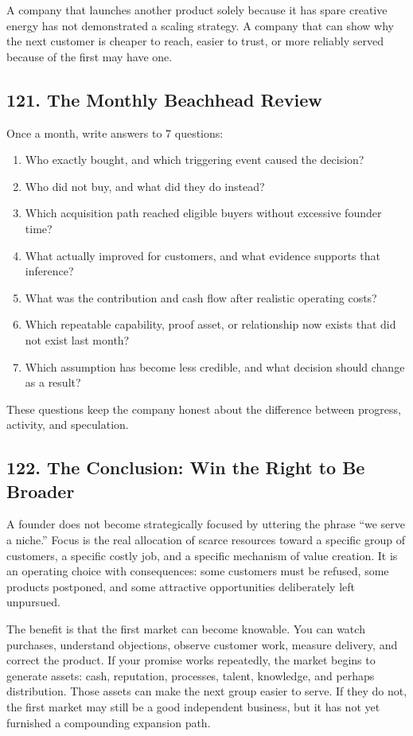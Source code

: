 A company that launches another product solely because it has spare creative energy has not demonstrated a scaling strategy. A company that can show why the next customer is cheaper to reach, easier to trust, or more reliably served because of the first may have one.

\subsection*{121. The Monthly Beachhead Review}

Once a month, write answers to 7 questions:

\begin{enumerate}
    \item Who exactly bought, and which triggering event caused the decision?
    \item Who did not buy, and what did they do instead?
    \item Which acquisition path reached eligible buyers without excessive founder time?
    \item What actually improved for customers, and what evidence supports that inference?
    \item What was the contribution and cash flow after realistic operating costs?
    \item Which repeatable capability, proof asset, or relationship now exists that did not exist last month?
    \item Which assumption has become less credible, and what decision should change as a result?
\end{enumerate}

These questions keep the company honest about the difference between progress, activity, and speculation.

\subsection*{122. The Conclusion: Win the Right to Be Broader}

A founder does not become strategically focused by uttering the phrase ``we serve a niche.'' Focus is the real allocation of scarce resources toward a specific group of customers, a specific costly job, and a specific mechanism of value creation. It is an operating choice with consequences: some customers must be refused, some products postponed, and some attractive opportunities deliberately left unpursued.

The benefit is that the first market can become knowable. You can watch purchases, understand objections, observe customer work, measure delivery, and correct the product. If your promise works repeatedly, the market begins to generate assets: cash, reputation, processes, talent, knowledge, and perhaps distribution. Those assets can make the next group easier to serve. If they do not, the first market may still be a good independent business, but it has not yet furnished a compounding expansion path.

